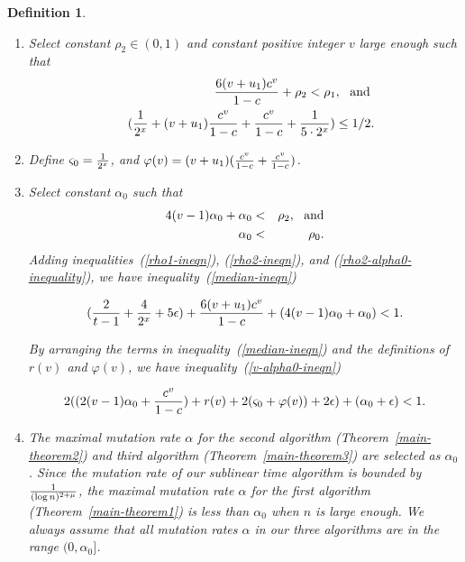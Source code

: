 \documentclass[11pt]{article}
\newtheorem{dfntn}[theoremfoo]{Definition}
\newenvironment{definition}{\pagebreak[1]\begin{dfntn}\rm}{\end{dfntn}}
\begin{document}
\begin{definition}
\begin{enumerate}
The existence of $\rho_1$ follows from $\epsilon< {1\over
5}(1-{2\over t-1}-{4\over 2^x})$, which is implied by
inequality~(\ref{epsilon-set-ineqn}).



\item Select constant $\rho_2\in (0,1)$ and  constant positive integer $v$ large enough such that
\begin{eqnarray}
&&{6(v+u_1)c^v\over 1-c}+\rho_2<\rho_1,\ \ {\rm and}\ \label{rho2-ineqn}\\
&&({1\over 2^x}+(v+u_1){c^{v}\over 1-c}+{c^v\over 1-c}+{1\over
5\cdot 2^x})\le {1/2}. \label{v2-ineqn}
\end{eqnarray}

\item
Define $\varsigma_0={1\over 2^x}$, and
$\varphi(v)=(v+u_1)({c^{v}\over 1-c}+{c^{v}\over 1-c})$.




\item Select constant $\alpha_0$ such that
\begin{eqnarray}
4(v-1)\alpha_0+\alpha_0&<&\rho_2,\ \ {\rm and}\label{rho2-alpha0-inequality}\\
\alpha_0&<&\rho_0.
\end{eqnarray}
 Adding inequalities~(\ref{rho1-ineqn}), (\ref{rho2-ineqn}), and (\ref{rho2-alpha0-inequality}), we have
 inequality~(\ref{median-ineqn})

\begin{eqnarray}
({2\over t-1}+{4\over 2^x}+5\epsilon)+{6(v+u_1)c^v\over
1-c}+(4(v-1)\alpha_0+\alpha_0)<1.\label{median-ineqn}
\end{eqnarray}

By arranging the terms in inequality~(\ref{median-ineqn}) and the
definitions of $r(v)$ and $\varphi(v)$, we have
inequality~(\ref{v-alpha0-ineqn})

\begin{eqnarray}
2((2(v-1)\alpha_0+{c^v\over
1-c})+r(v)+2(\varsigma_0+\varphi(v))+2\epsilon)+(\alpha_0+\epsilon)<1.\label{v-alpha0-ineqn}
\end{eqnarray}



\item
The maximal mutation rate $\alpha$ for the second algorithm
(Theorem~\ref{main-theorem2}) and third algorithm
(Theorem~\ref{main-theorem3}) are selected as $\alpha_0$. Since the
mutation rate of our sublinear time algorithm is bounded by ${1\over
(\log n)^{2+\mu}}$, the maximal mutation rate $\alpha$ for the first
algorithm (Theorem~\ref{main-theorem1}) is less than $\alpha_0$ when
$n$ is large enough. We always assume that all mutation rates
$\alpha$ in our three algorithms are in the range $(0,\alpha_0]$.




\end{enumerate}
\end{definition}
\end{document}
